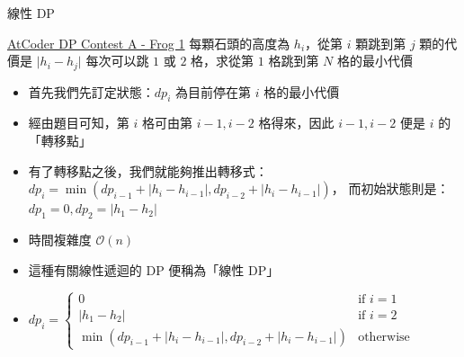 \documentclass[aspectratio=169]{beamer}
\begin{document}
    \begin{frame}{線性 DP}
        \begin{block}{\href{https://atcoder.jp/contests/dp/tasks/dp_a}{AtCoder DP Contest A - Frog 1}}
            每顆石頭的高度為 $h_i$，從第 $i$ 顆跳到第 $j$ 顆的代價是 $\lvert h_i - h_j \rvert$ 每次可以跳 $1$ 或 $2$ 格，求從第 $1$ 格跳到第 $N$ 格的最小代價
        \end{block}

        \begin{itemize}
            \item<1-> 首先我們先訂定狀態：$dp_i$ 為目前停在第 $i$ 格的最小代價
            \item<2-> 經由題目可知，第 $i$ 格可由第 $i - 1, i - 2$ 格得來，因此 $i - 1, i - 2$ 便是 $i$ 的「轉移點」
            \item<3-> 有了轉移點之後，我們就能夠推出轉移式：$dp_i = \min(dp_{i - 1} + \lvert h_{i} - h_{i - 1} \rvert, dp_{i - 2} + \lvert h_{i} - h_{i - 1} \rvert)$，
            而初始狀態則是：$dp_1 = 0, dp_2 = \lvert h_1 - h_2 \rvert$
            \item<4-> 時間複雜度 $\mathcal{O}(n)$
            \item<5-> 這種有關線性遞迴的 DP 便稱為「線性 DP」
            \item<6-> 
                $dp_i =
                \begin{cases}
                    0 & \text{if } i = 1 \\
                    \lvert h_1 - h_2 \rvert & \text{if } i = 2 \\
                    \min(dp_{i - 1} + \lvert h_{i} - h_{i - 1} \rvert, dp_{i - 2} + \lvert h_{i} - h_{i - 1} \rvert) & \text{otherwise}
                \end{cases}$
        \end{itemize}
    \end{frame}
\end{document}
